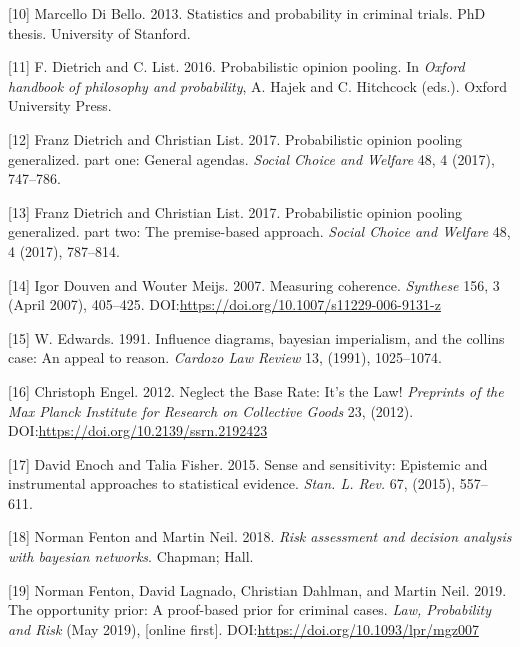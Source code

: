 \documentclass[11pt,dvipsnames,enabledeprecatedfontcommands]{scrartcl}
\begin{document}
\hypertarget{ref-di2013statistics}{}
{[}10{]} Marcello Di Bello. 2013. Statistics and probability in criminal
trials. PhD thesis. University of Stanford.

\hypertarget{ref-Dietrich2016Probabilistic}{}
{[}11{]} F. Dietrich and C. List. 2016. Probabilistic opinion pooling.
In \emph{Oxford handbook of philosophy and probability}, A. Hajek and C.
Hitchcock (eds.). Oxford University Press.

\hypertarget{ref-dietrich2017probabilistic1}{}
{[}12{]} Franz Dietrich and Christian List. 2017. Probabilistic opinion
pooling generalized. part one: General agendas. \emph{Social Choice and
Welfare} 48, 4 (2017), 747--786.

\hypertarget{ref-dietrich2017probabilistic2}{}
{[}13{]} Franz Dietrich and Christian List. 2017. Probabilistic opinion
pooling generalized. part two: The premise-based approach. \emph{Social
Choice and Welfare} 48, 4 (2017), 787--814.

\hypertarget{ref-Douven2007measuring}{}
{[}14{]} Igor Douven and Wouter Meijs. 2007. Measuring coherence.
\emph{Synthese} 156, 3 (April 2007), 405--425.
DOI:\url{https://doi.org/10.1007/s11229-006-9131-z}

\hypertarget{ref-Edwards1991Influence-diagr}{}
{[}15{]} W. Edwards. 1991. Influence diagrams, bayesian imperialism, and
the collins case: An appeal to reason. \emph{Cardozo Law Review} 13,
(1991), 1025--1074.

\hypertarget{ref-engel2012NeglectBaseRate}{}
{[}16{]} Christoph Engel. 2012. Neglect the Base Rate: It's the Law!
\emph{Preprints of the Max Planck Institute for Research on Collective
Goods} 23, (2012). DOI:\url{https://doi.org/10.2139/ssrn.2192423}

\hypertarget{ref-enoch2015sense}{}
{[}17{]} David Enoch and Talia Fisher. 2015. Sense and sensitivity:
Epistemic and instrumental approaches to statistical evidence.
\emph{Stan. L. Rev.} 67, (2015), 557--611.

\hypertarget{ref-Fenton2018Risk}{}
{[}18{]} Norman Fenton and Martin Neil. 2018. \emph{Risk assessment and
decision analysis with bayesian networks}. Chapman; Hall.

\hypertarget{ref-fenton2019OpportunityPriorProofbased}{}
{[}19{]} Norman Fenton, David Lagnado, Christian Dahlman, and Martin
Neil. 2019. The opportunity prior: A proof-based prior for criminal
cases. \emph{Law, Probability and Risk} (May 2019), {[}online first{]}.
DOI:\url{https://doi.org/10.1093/lpr/mgz007}
\end{document}
